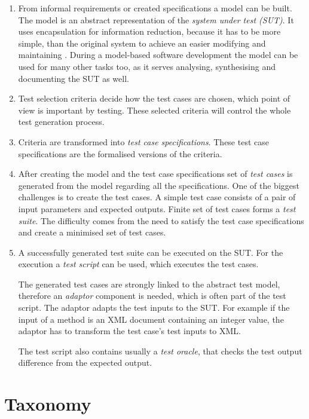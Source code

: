 \begin{enumerate}
    \item From informal requirements or created specifications a model can be built. The model is an abstract representation of the \textit{system under test (SUT)}. It uses encapsulation for information reduction, because it has to be more simple, than the original system to achieve an easier modifying and maintaining \cite{mbttestcasegeneration}. During a model-based software development the model can be used for many other tasks too, as it serves analysing, synthesising and documenting the SUT as well.
     \item Test selection criteria decide how the test cases are chosen, which point of view is important by testing. These selected criteria will control the whole test generation process.
     \item Criteria are transformed into \textit{test case specifications}. These test case specifications are the formalised versions of the criteria.
     \item After creating the model and the test case specifications set of \textit{test cases} is generated from the model regarding all the specifications. One of the biggest challenges is to create the test cases. A simple test case consists of a pair of input parameters and expected outputs. Finite set of test cases forms a \textit{test suite}. The difficulty comes from the need to satisfy the test case specifications and create a minimised set of test cases.
     \item A successfully generated test suite can be executed on the SUT. For the execution a \textit{test script} can be used, which executes the test cases.
     
     The generated test cases are strongly linked to the abstract test model, therefore an \textit{adaptor} component is needed, which is often part of the test script. The adaptor adapts the test inputs to the SUT. For example if the input of a method is an XML document containing an integer value, the adaptor has to transform the test case's test inputs to XML.
     
     The test script also contains usually a \textit{test oracle}, that checks the test output difference from the expected output.
\end{enumerate}

\section{Taxonomy}
\label{sec:taxonomy}

